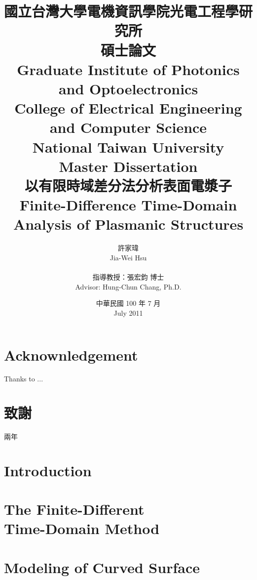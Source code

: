 \documentclass{book}
\begin{document}
\fontsize{12}{2em}\selectfont

\title{
  \kai 國立台灣大學電機資訊學院光電工程學研究所\\碩士論文\\
  \rm Graduate Institute of Photonics and Optoelectronics\\College of Electrical Engineering and Computer Science\\National Taiwan University\\Master Dissertation\\[1cm]
  \kai 以有限時域差分法分析表面電漿子\\
  \rm Finite-Difference Time-Domain Analysis of Plasmanic Structures
}
\author{
  \kai 許家瑋\\ \rm Jia-Wei Hsu\\\\
  \kai 指導教授：張宏鈞 博士\\ \rm Advisor: Hung-Chun Chang, Ph.D.
}
\date{
  \kai 中華民國 100 年 7 月\\ 
  \rm July 2011
}

\maketitle
{}
\tableofcontents


\chapter*{Acknownledgement}
Thanks to ...


\chapter*{\kai 致謝}
\kai
兩年
\rm

\chapter{Introduction}



\chapter{The Finite-Different \\Time-Domain Method}




\chapter{Modeling of Curved Surface}
\end{document}
